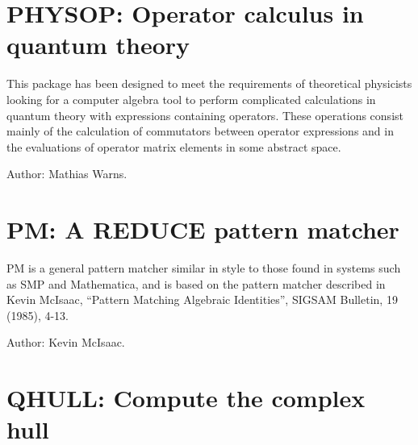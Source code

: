 \section{PHYSOP: Operator calculus in quantum theory}


This package has been designed to meet the requirements of theoretical
physicists looking for a computer algebra tool to perform complicated
calculations in quantum theory with expressions containing operators.
These operations consist mainly of the calculation of commutators between
operator expressions and in the evaluations of operator matrix elements in
some abstract space.

Author: Mathias Warns.



\newpage

\section{PM: A REDUCE pattern matcher}

PM is a general pattern matcher similar in style to those found in systems
such as SMP and Mathematica, and is based on the pattern matcher described
in Kevin McIsaac, ``Pattern Matching Algebraic Identities'', SIGSAM Bulletin,
19 (1985), 4-13.

Author: Kevin McIsaac.



\newpage


\section{QHULL: Compute the complex hull}


